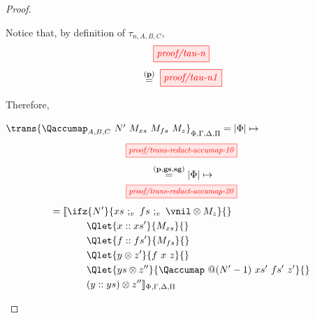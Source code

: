 \begin{proof}
\begin{itemize}
            Notice that, by definition of $\tau_{n,A,B,C}$,
            \[
                \tikzfig{proof/tau-n}
            \]
            \[
                \;\overset{\scriptstyle{{\bf(p)}}}{=}\;
                \tikzfig{proof/tau-n1}
            \]

            Therefore,

            \(
                \trans{\Qaccumap_{A,B,C}\ N'\ M_{xs}\ M_{fs}\ M_{z}}_{\Phi,\Gamma,\Delta,\Pi} = |\Phi|\mapsto
            \)
            \[
                \scalebox{0.8}{\tikzfig{proof/trans-reduct-accumap-10}}
            \]
            \begin{gather*}
                \;\overset{\scriptstyle{{\bf(p,gs,sg)}}}{=}|\Phi|\mapsto\\
                \scalebox{0.8}{\tikzfig{proof/trans-reduct-accumap-20}}
            \end{gather*}
            \begin{align*}
                =\llbracket & \ifz{N'}{xs\ ;_v\ fs\ ;_v\ \vnil\otimes M_z}{}\\
                    &\qquad\Qlet{x :: xs'}{M_{xs}}{} \\
                    &\qquad\Qlet{f :: fs'}{M_{fs}}{} \\
                    &\qquad\Qlet{y\otimes z'}{f\ x\ z}{} \\
                    &\qquad\Qlet{ys \otimes z''}{\Qaccumap\ @(N'-1)\ xs'\ fs'\ z'}{} \\
                    &\qquad(y :: ys) \otimes z''\rrbracket_{\Phi,\Gamma,\Delta,\Pi}
            \end{align*}


\end{itemize}
\end{proof}
